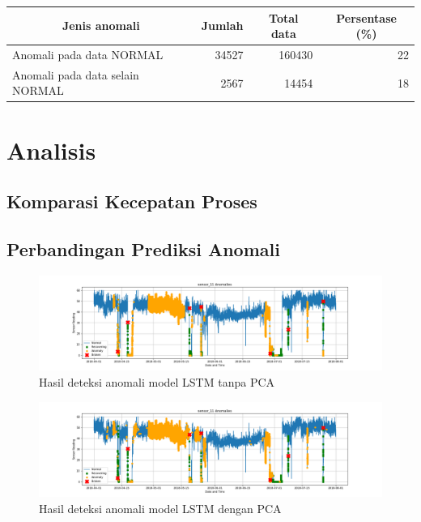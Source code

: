 \begin{table}[h]
    \centering
    \begin{tabular}{|l|r|r|r|}
        \hline
        \multicolumn{1}{|c|}{\textbf{Jenis anomali}} & \multicolumn{1}{c|}{\textbf{Jumlah}} & \multicolumn{1}{c|}{\textbf{Total data}} & \multicolumn{1}{c|}{\textbf{Persentase (\%)}} \\ \hline
        Anomali pada data NORMAL                     & 34527                                & 160430                                   & 22                                       \\ \hline
        Anomali pada data selain NORMAL              & 2567                                 & 14454                                    & 18                                       \\ \hline
    \end{tabular}
\end{table}

\section{Analisis}
    \subsection{Komparasi Kecepatan Proses}
    
    \subsection{Perbandingan Prediksi Anomali}

    \begin{figure}[h]
        \centerline{\includegraphics[width=1.4\textwidth]{resources/LSTM/LSTM_noPCA_sensor_11.png}}
        \caption{Hasil deteksi anomali model LSTM tanpa PCA}
    \end{figure}
    
    \begin{figure}[h]
        \centerline{\includegraphics[width=1.4\textwidth]{resources/LSTM/LSTM_PCA_sensor_11.png}}
        \caption{Hasil deteksi anomali model LSTM dengan PCA}
    \end{figure}
    

